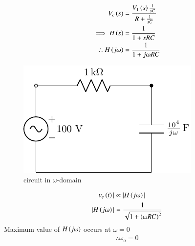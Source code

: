 \documentclass[journal,12pt,twocolumn]{IEEEtran}
\theoremstyle{remark}
\begin{document}
\begin{align}
V_c\left(s\right)&= \frac{V_1\left(s\right)\frac{1}{sC}}{R+\frac{1}{sC}}\\
\implies H\left(s\right) &= \frac{1}{1+ sRC}\\
\therefore H\left(j\omega\right) &= \frac{1}{1+j\omega RC} 
\end{align}
\begin{figure}[h!]
    \includegraphics[width = \columnwidth]{figs/c_fig2.pdf}
    \caption{circuit in $ \omega$-domain }
    \centering
    \label{fig: bm_16_fig_2}
\end{figure}

\begin{align}
|v_c\left(t\right)| &\propto |H\left(j\omega\right)|\\
|H\left(j\omega\right)| &= \frac{1}{\sqrt{1+\left(\omega RC\right)^2}} 
\end{align}
Maximum value of $ H\left(j\omega\right)$ occurs at $ \omega=0$
\begin{align}
\therefore \omega_o =0
\end{align}
\end{document}

